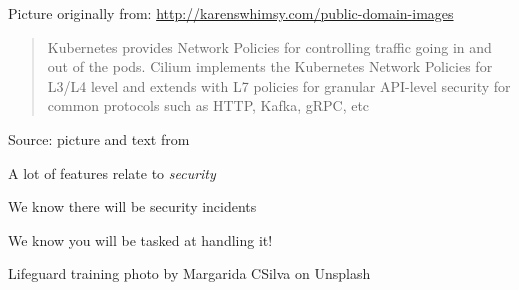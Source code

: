 \documentclass[Screen16to9,17pt]{foils}
\begin{document}

\centerline{Picture originally from: \url{http://karenswhimsy.com/public-domain-images}}




\begin{quote}
Kubernetes provides Network Policies for controlling traffic going in and out of the pods. Cilium implements the Kubernetes Network Policies for L3/L4 level and extends with L7 policies for granular API-level security for common protocols such as HTTP, Kafka, gRPC, etc
\end{quote}
Source: picture and text from 




\begin{list2}
\item A lot of features relate to \emph{security}
\end{list2}




\begin{list2}
\item We know there will be security incidents
\item We know you will be tasked at handling it!
\end{list2}

Lifeguard training photo by Margarida CSilva on Unsplash




\begin{center}
\hlkbig

\myname

\end{center}
\end{document}
